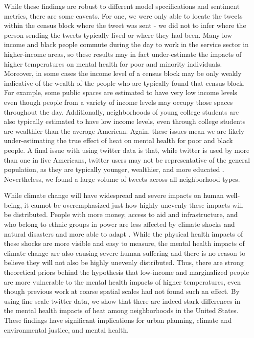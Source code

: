 \documentclass[fleqn,10pt]{wlscirep}
\begin{document}
While these findings are robust to different model specifications and sentiment metrics, there are some caveats.  For one, we were only able to locate the tweets within the census block where the tweet was sent - we did not to infer where the person sending the tweets typically lived or where they had been.  Many low-income and black people commute during the day to work in the service sector in higher-income areas, so these results may in fact under-estimate the impacts of higher temperatures on mental health for poor and minority individuals.  Moreover, in some cases the income level of a census block may be only weakly indicative of the wealth of the people who are typically found that census block.  For example, some public spaces are estimated to have very low income levels even though people from a variety of income levels may occupy those spaces throughout the day.  Additionally, neighborhoods of young college students are also typically estimated to have low income levels, even through college students are wealthier than the average American.  Again, these issues mean we are likely under-estimating the true effect of heat on mental health for poor and black people.  A final issue with using twitter data is that, while twitter is used by more than one in five Americans, twitter users may not be representative of the general population, as they are typically younger, wealthier, and more educated \cite{Pew2020Sep}.  Nevertheless, we found a large volume of tweets across all neighborhood types.

While climate change will have widespread and severe impacts on human well-being, it cannot be overemphasized just how highly unevenly these impacts will be distributed.  People with more money, access to aid and infrastructure, and who belong to ethnic groups in power are less affected by climate shocks and natural disasters and more able to adapt \cite{bullard2012wrong}.  While the physical health impacts of these shocks are more visible and easy to measure, the mental health impacts of climate change are also causing severe human suffering and there is no reason to believe they will not also be highly unevenly distributed.  Thus, there are strong theoretical priors behind the hypothesis that low-income and marginalized people are more vulnerable to the mental health impacts of higher temperatures, even though previous work at coarse spatial scales had not found such an effect.  By using fine-scale twitter data, we show that there are indeed stark differences in the mental health impacts of heat among neighborhoods in the United States.  These findings have significant implications for urban planning, climate and environmental justice, and mental health.
\end{document}
